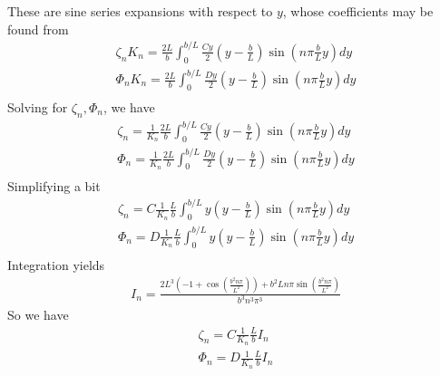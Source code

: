 \documentclass[11pt]{article}
\begin{document}
These are sine series expansions with respect to $y$, whose coefficients may be found from
\begin{equation}\begin{aligned}
\zeta_n K_n = \frac{2L}{b} \int_0^{b/L} \frac{C y}{2} \left(y - \frac{b}{L}\right) \sin\left( n \pi \frac{b}{L}y \right) dy \\
\Phi_n  K_n = \frac{2L}{b} \int_0^{b/L} \frac{D y}{2} \left(y - \frac{b}{L}\right) \sin\left( n \pi \frac{b}{L}y \right) dy \\
\end{aligned} \end{equation}
Solving for $\zeta_n,\Phi_n$, we have
\begin{equation}\begin{aligned}
\zeta_n = \frac{1}{K_n} \frac{2L}{b} \int_0^{b/L} \frac{C y}{2} \left(y - \frac{b}{L}\right) \sin\left( n \pi \frac{b}{L}y \right) dy \\
\Phi_n  = \frac{1}{K_n} \frac{2L}{b} \int_0^{b/L} \frac{D y}{2} \left(y - \frac{b}{L}\right) \sin\left( n \pi \frac{b}{L}y \right) dy \\
\end{aligned} \end{equation}
Simplifying a bit
\begin{equation}\begin{aligned}
\zeta_n = C \frac{1}{K_n} \frac{L}{b} \int_0^{b/L} y \left(y - \frac{b}{L}\right) \sin\left( n \pi \frac{b}{L}y \right) dy \\
\Phi_n  = D \frac{1}{K_n} \frac{L}{b} \int_0^{b/L} y \left(y - \frac{b}{L}\right) \sin\left( n \pi \frac{b}{L}y \right) dy \\
\end{aligned} \end{equation}
Integration yields
\begin{equation}\begin{aligned}
I_n=\frac{2 L^3  \left( -1+\cos \left( \frac{b^2 n \pi}{L^2} \right) \right) +b^2 L n \pi \sin \left( \frac{b^2 n \pi}{L^2} \right) }{b^3 n^3 \pi^3}
\end{aligned} \end{equation}
So we have
\begin{equation}\begin{aligned}
\zeta_n = C \frac{1}{K_n} \frac{L}{b} I_n \\
\Phi_n  = D \frac{1}{K_n} \frac{L}{b} I_n \\
\end{aligned} \end{equation}
\end{document}
